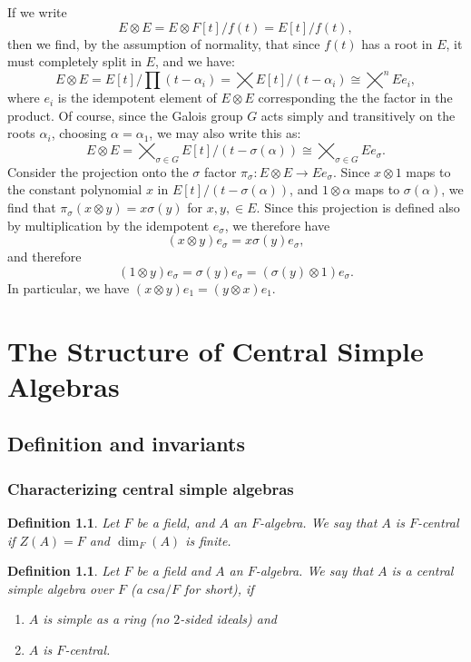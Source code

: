 \documentclass[12pt]{report}
\theoremstyle{plain}
\newtheorem{defn}[thm]{Definition}
\newcommand{\X}[1]{#1\index{#1}}
\begin{document}
If we write
\[E \otimes E = E \otimes F[t]/f(t) = E[t]/f(t),\]
then we find, by the assumption of normality, that since $f(t)$ has a root
in $E$, it must completely split in $E$, and we have:
\[E \otimes E = E[t]/\prod (t - \alpha_i) = \bigtimes E[t]/(t - \alpha_i)
\cong \bigtimes^n E e_i,\]
where $e_i$ is the idempotent element of $E \otimes E$ corresponding the
the factor in the product.  Of course, since the Galois group $G$ acts
simply and transitively on the roots $\alpha_i$, choosing $\alpha =
\alpha_1$, we may also write this as:
\[E \otimes E = \bigtimes_{\sigma \in G} E[t]/(t - \sigma(\alpha)) \cong
\bigtimes_{\sigma \in G} E e_\sigma.\]
Consider the projection onto the $\sigma$ factor $\pi_\sigma: E
\otimes E \to E e_\sigma$. Since $x \otimes 1$ maps to the constant
polynomial $x$ in $E[t]/(t -
\sigma(\alpha))$, and $1 \otimes \alpha$ maps to $\sigma(\alpha)$, we find
that $\pi_\sigma(x \otimes y) = x \sigma(y)$ for $x, y, \in E$. Since this
projection is defined also by multiplication by the idempotent $e_\sigma$,
we therefore have
\[(x \otimes y) e_\sigma = x\sigma(y) e_\sigma,\]
and therefore 
\[(1 \otimes y) e_\sigma = \sigma(y) e_\sigma = (\sigma(y) \otimes 1) e_\sigma.\]
In particular, we have $(x \otimes y) e_1 = (y \otimes x) e_1$.

\chapter{The Structure of Central Simple Algebras}

\section{Definition and invariants}

\subsection{Characterizing central simple algebras}

\begin{defn}
Let $F$ be a field, and $A$ an $F$-algebra. We say that $A$ is $F$-central
if $Z(A) = F$ and $\dim_F(A)$ is finite.
\end{defn}

\begin{defn}
Let $F$ be a field and $A$ an $F$-algebra. We say that $A$ is a \X{central
simple algebra} over $F$ (a $csa/F$ for short), if
\begin{enumerate}[1. ]
\item $A$ is simple as a ring (no $2$-sided ideals) and
\item $A$ is $F$-central. 
\end{enumerate}
\end{defn}
\end{document}

